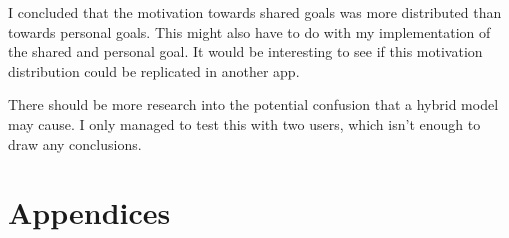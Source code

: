 \documentclass{l4proj}
\begin{document}
I concluded that the motivation towards shared goals was more distributed than towards personal goals. This might also have to do with my implementation of the shared and personal goal. It would be interesting to see if this motivation distribution could be replicated in another app.

There should be more research into the potential confusion that a hybrid model may cause. I only managed to test this with two users, which isn't enough to draw any conclusions.





\chapter{Appendices}

\end{document}
